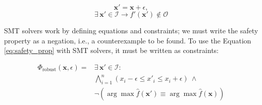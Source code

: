 \begin{equation}
    \textbf{x}' = \textbf{x}+\epsilon,
\end{equation}
\begin{equation} \label{eq:safety_prop}
    \exists \, \textbf{x}' \in \mathcal{I} \rightarrow f'(\textbf{x}')\notin \mathcal{O}
\end{equation}

SMT solvers work by defining equations and constraints; we must write the safety property as a negation, i.e., a counterexample to be found. To use the Equation \ref{eq:safety_prop} with SMT solvers, it must be written as constraints:

\begin{align*}
\Phi_{\text{robust}}(\mathbf{x}, \epsilon) = & \exists \, \mathbf{x}' \in \mathcal{I} : \\
& \bigwedge_{i=1}^n (x_i - \epsilon \leq x'_i \leq x_i + \epsilon) \ \land \\
& \lnot (\arg\max \hat{f}(\mathbf{x}') \equiv \arg\max \hat{f}(\mathbf{x}))
\end{align*}
    
